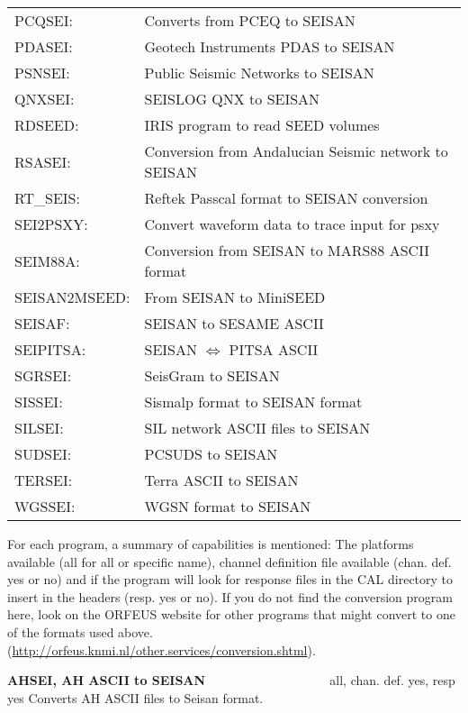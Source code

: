 \begin{tabular}{lp{10cm}}
PCQSEI: & Converts from PCEQ to SEISAN  \\
PDASEI: & Geotech Instruments PDAS to SEISAN  \\
PSNSEI: & Public Seismic Networks to SEISAN \\
QNXSEI: & SEISLOG QNX to SEISAN \\
RDSEED: & IRIS program to read SEED volumes \\
RSASEI: & Conversion from Andalucian Seismic network to SEISAN\index{Andalucia} \\
RT\_SEIS: & Reftek Passcal format to SEISAN conversion \\
SEI2PSXY: & Convert waveform data to trace input for psxy \\
SEIM88A: & Conversion from SEISAN to MARS88 ASCII format \\
SEISAN2MSEED: & From SEISAN to MiniSEED \\
SEISAF: & SEISAN to SESAME ASCII \\
SEIPITSA: & SEISAN $\Leftrightarrow$ PITSA ASCII \\
SGRSEI: & SeisGram to SEISAN \\
SISSEI: & Sismalp format to SEISAN format \\
SILSEI: & SIL network ASCII files to SEISAN \\
SUDSEI: & PCSUDS to SEISAN \\
TERSEI: & Terra ASCII to SEISAN \\
WGSSEI: & WGSN format to SEISAN 
\end{tabular}

For each program, a summary of capabilities is mentioned: The platforms 
available (all for all or specific name), channel definition file 
available (chan. def. yes or no) and if the program will look for 
response files in the CAL directory to insert in the headers (resp. yes or no). \newline
If you do not find the conversion program here, look on the  ORFEUS 
website for other programs that might convert to one 
of the formats used above. \newline
(\url{http://orfeus.knmi.nl/other.services/conversion.shtml}). 

{
\textbf{AHSEI, AH ASCII to SEISAN} \verb|                  | all, chan. def. yes, resp yes\newline
{}
Converts AH ASCII files to Seisan format.
}

